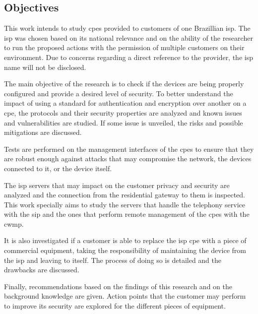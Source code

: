 \subsection{Objectives}

This work intends to study \glspl{cpe} provided to customers of one Brazillian \gls{isp}. The \gls{isp} was chosen based on its national relevance and on the ability of the researcher to run the proposed actions with the permission of multiple customers on their environment. Due to concerns regarding a direct reference to the provider, the \gls{isp} name will not be disclosed.

The main objective of the research is to check if the devices are being properly configured and provide a desired level of security. To better understand the impact of using a standard for authentication and encryption over another on a \gls{cpe}, the protocols and their security properties are analyzed and known issues and vulnerabilities are studied. If some issue is unveiled, the risks and possible mitigations are discussed.

Tests are performed on the management interfaces of the \glspl{cpe} to ensure that they are robust enough against attacks that may compromise the network, the devices connected to it, or the device itself.

The \gls{isp} servers that may impact on the customer privacy and security are analyzed and the connection from the residential gateway to them is inspected. This work specially aims to study the servers that handle the telephony service with the \gls{sip} and the ones that perform remote management of the \glspl{cpe} with the \gls{cwmp}.

It is also investigated if a customer is able to replace the \gls{isp} \gls{cpe} with a piece of commercial equipment, taking the responsibility of maintaining the device from the \gls{isp} and leaving to itself. The process of doing so is detailed and the drawbacks are discussed.

Finally, recommendations based on the findings of this research and on the background knowledge are given. Action points that the customer may perform to improve its security are explored for the different pieces of equipment.
